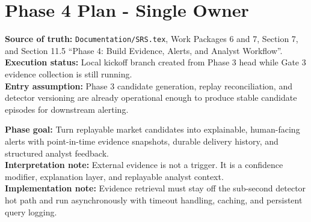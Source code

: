 \documentclass{article}
\begin{document}
\section*{Phase 4 Plan - Single Owner}

\textbf{Source of truth:} \texttt{Documentation/SRS.tex}, Work Packages 6 and 7, Section 7, and Section 11.5 ``Phase 4: Build Evidence, Alerts, and Analyst Workflow''.\\
\textbf{Execution status:} Local kickoff branch created from Phase 3 head while Gate 3 evidence collection is still running.\\
\textbf{Entry assumption:} Phase 3 candidate generation, replay reconciliation, and detector versioning are already operational enough to produce stable candidate episodes for downstream alerting.

\textbf{Phase goal:} Turn replayable market candidates into explainable, human-facing alerts with point-in-time evidence snapshots, durable delivery history, and structured analyst feedback.\\
\textbf{Interpretation note:} External evidence is not a trigger. It is a confidence modifier, explanation layer, and replayable analyst context.\\
\textbf{Implementation note:} Evidence retrieval must stay off the sub-second detector hot path and run asynchronously with timeout handling, caching, and persistent query logging.
\end{document}
